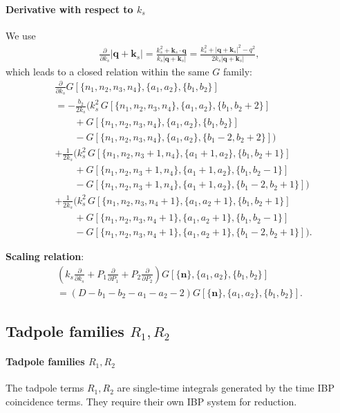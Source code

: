\documentclass[a4paper,12pt]{article}
\newcommand{\n}{\nonumber}
\begin{document}
\paragraph{Derivative with respect to $k_s$}
We use
\begin{align}
	\frac{\partial}{\partial k_s}|\bm q+\bm k_s|
	=\frac{k_s^2+\bm k_s\cdot \bm q}{k_s|\bm q+\bm k_s|}
	=\frac{k_s^2+|\bm q+\bm k_s|^2-q^2}{2k_s|\bm q+\bm k_s|},
\end{align}
which leads to a closed relation within the same $G$ family:
\begin{align}
	&\frac{\partial}{\partial k_s}G[\{n_1,n_2,n_3,n_4\},\{a_1,a_2\},\{b_1,b_2\}] \n\\
	&=-\frac{b_2}{2k_s}\Big(
	k_s^2\,G[\{n_1,n_2,n_3,n_4\},\{a_1,a_2\},\{b_1,b_2+2\}] \nonumber\\
	&\qquad
	+G[\{n_1,n_2,n_3,n_4\},\{a_1,a_2\},\{b_1,b_2\}] \nonumber\\
	&\qquad
	-G[\{n_1,n_2,n_3,n_4\},\{a_1,a_2\},\{b_1-2,b_2+2\}]
	\Big) \nonumber\\
	&+\frac{1}{2k_s}\Big(
	k_s^2\,G[\{n_1,n_2,n_3+1,n_4\},\{a_1+1,a_2\},\{b_1,b_2+1\}] \nonumber\\
	&\qquad
	+G[\{n_1,n_2,n_3+1,n_4\},\{a_1+1,a_2\},\{b_1,b_2-1\}] \nonumber\\
	&\qquad
	-G[\{n_1,n_2,n_3+1,n_4\},\{a_1+1,a_2\},\{b_1-2,b_2+1\}]
	\Big) \nonumber\\
	&+\frac{1}{2k_s}\Big(
	k_s^2\,G[\{n_1,n_2,n_3,n_4+1\},\{a_1,a_2+1\},\{b_1,b_2+1\}] \nonumber\\
	&\qquad
	+G[\{n_1,n_2,n_3,n_4+1\},\{a_1,a_2+1\},\{b_1,b_2-1\}] \nonumber\\
	&\qquad
	-G[\{n_1,n_2,n_3,n_4+1\},\{a_1,a_2+1\},\{b_1-2,b_2+1\}]
	\Big). \label{eq:Gdks}
\end{align}

\textbf{Scaling relation}:
\begin{align}
	\left( k_s \frac{\partial}{\partial k_s} + P_1 \frac{\partial}{\partial P_1} + P_2 \frac{\partial}{\partial P_2} \right) G[\{\bm n\},\{a_1,a_2\},\{b_1,b_2\}] \n\\
	= (D - b_1 - b_2 - a_1 - a_2 - 2) G[\{\bm n\},\{a_1,a_2\},\{b_1,b_2\}]. \label{eq:Gscaling}
\end{align}

\subsection{Tadpole families \texorpdfstring{$R_1,R_2$}{R1, R2}}
\paragraph{Tadpole families $R_1,R_2$}
The tadpole terms $R_1,R_2$ are single-time integrals generated by the time IBP coincidence terms. They require their own IBP system for reduction.
\end{document}
